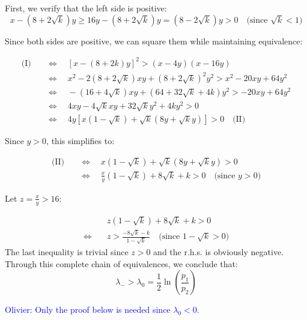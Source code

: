 \documentclass[a4paper, 10pt]{article}
\theoremstyle{definition}
\begin{document}
First, we verify that the left side is positive:
\[
x - (8 + 2\sqrt{k})y \geq 16y - (8 + 2\sqrt{k})y = (8 - 2\sqrt{k})y > 0 \quad \text{(since } \sqrt{k} < 1\text{)}
\]

Since both sides are positive, we can square them while maintaining equivalence:

\begin{align*}
\text{(I)}\quad &\Leftrightarrow\quad [x - (8 + 2k)y]^2 > (x-4y)(x-16y) \\
&\Leftrightarrow\quad x^2 - 2(8 + 2\sqrt{k})xy + (8 + 2\sqrt{k})^2y^2 > x^2 - 20xy + 64y^2 \\
&\Leftrightarrow\quad - (16 + 4\sqrt{k})xy + (64 + 32\sqrt{k} + 4k)y^2 > -20xy + 64y^2 \\
&\Leftrightarrow\quad 4xy - 4\sqrt{k}xy + 32\sqrt{k}y^2 + 4ky^2 > 0 \\
&\Leftrightarrow\quad 4y[x(1 - \sqrt{k}) + \sqrt{k}(8y + \sqrt{k}y)] > 0 \quad \text{(II)}
\end{align*}


Since $y > 0$, this simplifies to:

\begin{align*}
\text{(II)}\quad &\Leftrightarrow\quad x(1 - \sqrt{k}) + \sqrt{k}(8y + \sqrt{k}y) > 0 \\
&\Leftrightarrow\quad \frac{x}{y}(1 - \sqrt{k}) + 8\sqrt{k} + k > 0 \quad \text{(since } y > 0\text{)}
\end{align*}

Let $z = \frac{x}{y} > 16$:

\begin{align*}
& z(1 - \sqrt{k}) + 8\sqrt{k} + k > 0 \\
\Leftrightarrow\quad & z > \frac{-8\sqrt{k} - k}{1 - \sqrt{k}} \quad \text{(since } 1 - \sqrt{k} > 0\text{)}
\end{align*}
The last inequality is trivial since $z>0$ and the r.h.s. is obviously negative.
Through this complete chain of equivalences, we conclude that:
\[
\lambda_- > \lambda_0 = \frac{1}{2}\ln\left(\frac{p_1}{p_2}\right)
\]

\textcolor{blue}{Olivier: Only the proof below is needed since $\lambda_0<0$.}
\end{document}
